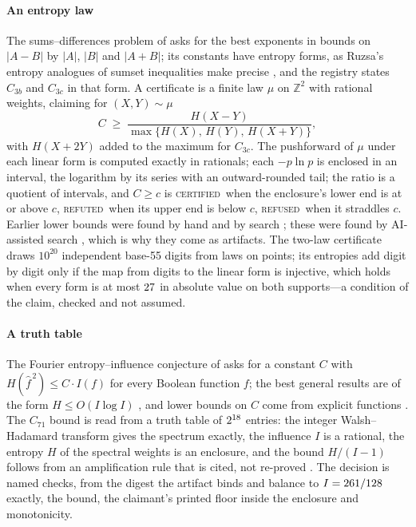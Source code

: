 \documentclass[preprint,11pt,authoryear,a4paper]{elsarticle}
\newcommand{\vword}[1]{{\normalfont\scshape #1}}
\newcommand{\vC}{\vword{certified}}
\newcommand{\vR}{\vword{refuted}}
\newcommand{\vF}{\vword{refused}}
\newcommand{\Z}{\mathbb{Z}}
\begin{document}
\paragraph{An entropy law} The sums--differences problem of \citet{KatzTao99} asks for the best exponents in bounds on $|A - B|$ by $|A|$, $|B|$ and $|A + B|$; its constants have entropy forms, as Ruzsa's entropy analogues of sumset inequalities make precise \citep{LauNair23}, and the registry states $C_{3b}$ and $C_{3c}$ in that form. A certificate is a finite law $\mu$ on $\Z^2$ with rational weights, claiming for $(X, Y) \sim \mu$
\[
C \;\ge\; \frac{H(X - Y)}{\max\{H(X),\, H(Y),\, H(X + Y)\}},
\]
with $H(X + 2Y)$ added to the maximum for $C_{3c}$. The pushforward of $\mu$ under each linear form is computed exactly in rationals; each $-p \ln p$ is enclosed in an interval, the logarithm by its series with an outward-rounded tail; the ratio is a quotient of intervals, and $C \ge c$ is \vC\ when the enclosure's lower end is at or above $c$, \vR\ when its upper end is below $c$, \vF\ when it straddles $c$. Earlier lower bounds were found by hand and by search \citep{Lemm15}; these were found by AI-assisted search \citep{GGSWT25}, which is why they come as artifacts. The two-law certificate draws $10^{20}$ independent base-55 digits from laws on \MtRqTwoLawPoints{} points; its entropies add digit by digit only if the map from digits to the linear form is injective, which holds when every form is at most $27$ in absolute value on both supports---a condition of the claim, checked and not assumed.

\paragraph{A truth table} The Fourier entropy--influence conjecture of \citet{FriedgutKalai96} asks for a constant $C$ with $H(\hat f^{\,2}) \le C \cdot I(f)$ for every Boolean function $f$; the best general results are of the form $H \le O(I \log I)$ \citep{KKLMS20}, and lower bounds on $C$ come from explicit functions \citep{ODonnellTan13,Hod17}. The $C_{71}$ bound is read from a truth table of $2^{18}$ entries: the integer Walsh--Hadamard transform gives the spectrum exactly, the influence $I$ is a rational, the entropy $H$ of the spectral weights is an enclosure, and the bound $H/(I - 1)$ follows from an amplification rule that is cited, not re-proved \citep{ODonnellTan13,Hod17}. The decision is \MtRgFeiChecks{} named checks, from the digest the artifact binds and balance to $I = 261/128$ exactly, the bound, the claimant's printed floor inside the enclosure and monotonicity.
\end{document}
